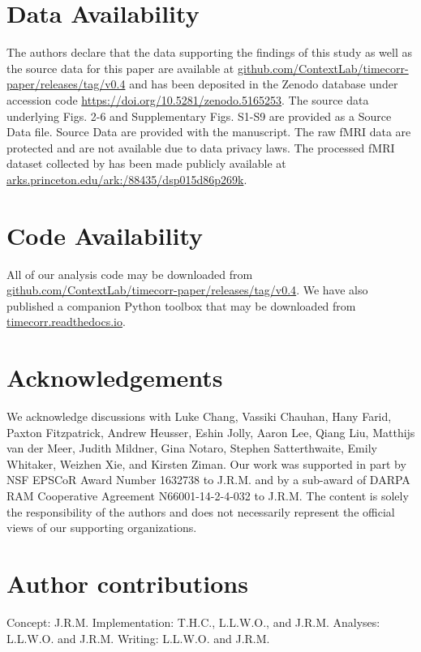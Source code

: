 \documentclass[english]{article}
\begin{document}
\section*{Data Availability}

The authors declare that the data supporting the findings of this
study as well as the source data for this paper are available at
\href{https://github.com/ContextLab/timecorr-paper/releases/tag/v0.4}{github.com/ContextLab/timecorr-paper/releases/tag/v0.4}
and has been deposited in the Zenodo database under accession code
\href{https://doi.org/10.5281/zenodo.5165253}{https://doi.org/10.5281/zenodo.5165253}.
The source data underlying Figs. 2-6 and Supplementary Figs. S1-S9 are
provided as a Source Data file. Source Data are provided with the
manuscript. The raw fMRI data are protected and are not available due to data
privacy laws. The processed fMRI dataset collected by
\cite{SimoEtal16} has been made publicly available \cite{SimoEtal16b} at
\href{http://arks.princeton.edu/ark:/88435/dsp015d86p269k}{arks.princeton.edu/ark:/88435/dsp015d86p269k}. 

\section*{Code Availability}

All of our analysis code may be downloaded from
\href{https://github.com/ContextLab/timecorr-paper/releases/tag/v0.3}{github.com/ContextLab/timecorr-paper/releases/tag/v0.4}. We have also published a companion Python toolbox that may be downloaded from \href{https://timecorr.readthedocs.io}{timecorr.readthedocs.io}.


\section*{Acknowledgements}
We acknowledge discussions with Luke Chang, Vassiki Chauhan, Hany
Farid, Paxton Fitzpatrick, Andrew Heusser, Eshin Jolly, Aaron Lee,
Qiang Liu, Matthijs van der Meer, Judith Mildner, Gina Notaro, Stephen
Satterthwaite, Emily Whitaker, Weizhen Xie, and Kirsten Ziman. Our
work was supported in part by NSF EPSCoR Award Number 1632738 to
J.R.M. and by a sub-award of DARPA RAM Cooperative Agreement
N66001-14-2-4-032 to J.R.M.  The content is solely the responsibility
of the authors and does not necessarily represent the official views
of our supporting organizations.

\section*{Author contributions}
Concept: J.R.M.  Implementation: T.H.C., L.L.W.O., and J.R.M.
Analyses: L.L.W.O. and J.R.M.  Writing: L.L.W.O. and J.R.M.
\end{document}
